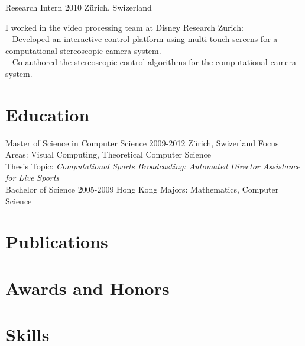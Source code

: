 \documentclass{kaeserchen_cv}
\begin{document}
                {Research Intern}
                {2010}
                {Z\"urich, Swizerland}

I worked in the video processing team at Disney Research Zurich: \\
\textbullet ~ Developed an interactive control platform using 
              multi-touch screens for a computational stereoscopic camera system. \\
\textbullet ~ Co-authored the stereoscopic control algorithms for the 
              computational camera system.

\section{Education}
               {Master of Science in Computer Science}
               {2009-2012}
               {Z\"urich, Swizerland}
               {Focus Areas: Visual Computing, Theoretical Computer Science \\
                Thesis Topic: \textit{Computational Sports Broadcasting: Automated Director 
                                      Assistance for Live Sports} \\}
\newline
{}
               {Bachelor of Science}
               {2005-2009}
               {Hong Kong}
               {Majors: Mathematics, Computer Science}

\section{Publications}
\begin{flushleft}
\begingroup
\renewcommand{\section}[2]{}
\makeatletter
\renewcommand\@biblabel[1]{\textbullet}
\makeatother
\setlength{\bibsep}{2pt}


\nocite{*}
\endgroup
\vspace{-0\baselineskip}
\end{flushleft}

\section{Awards and Honors}
\begin{awardssection}
\end{awardssection}


\section{Skills}
\begin{skillssection}
\end{skillssection}
\end{document}

